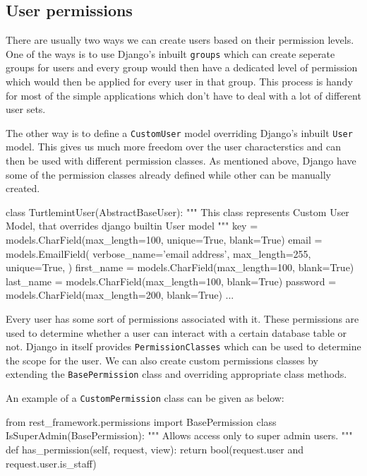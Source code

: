 \subsection{User permissions}
There are usually two ways we can create users based on their permission
levels. One of the ways is to use Django's inbuilt \texttt{groups} which can
create seperate groups for users and every group would then have a dedicated
level of permission which would then be applied for every user in that group.
This process is handy for most of the simple applications which don't have
to deal with a lot of different user sets.

The other way is to define a \texttt{CustomUser} model overriding Django's
inbuilt \texttt{User} model. This gives us much more freedom over the user
characterstics and can then be used with different permission classes. As
mentioned above, Django have some of the permission classes already defined
while other can be manually created.

\begin{pythoncode}
class TurtlemintUser(AbstractBaseUser):
    """
    This class represents Custom User Model,
    that overrides django builtin User model
    """
    key = models.CharField(max_length=100, unique=True, blank=True)
    email = models.EmailField(
        verbose_name='email address',
        max_length=255,
        unique=True,
    )
    first_name = models.CharField(max_length=100, blank=True)
    last_name = models.CharField(max_length=100, blank=True)
    password = models.CharField(max_length=200, blank=True)
    ...
\end{pythoncode}

Every user has some sort of permissions associated with it. These permissions
are used to determine whether a user can interact with a certain database table
or not. Django in itself provides \texttt{PermissionClasses} which can be used
to determine the scope for the user. We can also create custom permissions
classes by extending the \texttt{BasePermission} class and overriding
appropriate class methods.

An example of a \texttt{CustomPermission} class can be given as below:
\begin{pythoncode}
from rest_framework.permissions import BasePermission
class IsSuperAdmin(BasePermission):
    """
    Allows access only to super admin users.
    """
    def has_permission(self, request, view):
        return bool(request.user and request.user.is_staff)
\end{pythoncode}

